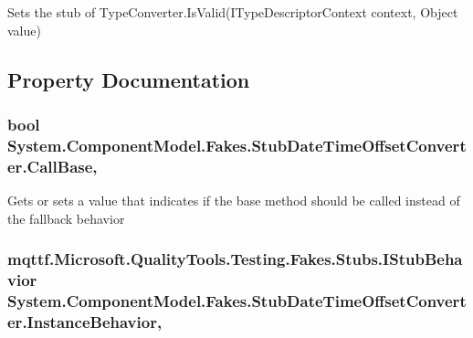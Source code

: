 Sets the stub of Type\-Converter.\-Is\-Valid(\-I\-Type\-Descriptor\-Context context, Object value)



\subsection{Property Documentation}
\hypertarget{class_system_1_1_component_model_1_1_fakes_1_1_stub_date_time_offset_converter_a274bfe86e647f89a1c5f72efcd0aced6}{
\subsubsection[{Call\-Base}]{\setlength{\rightskip}{0pt plus 5cm}bool System.\-Component\-Model.\-Fakes.\-Stub\-Date\-Time\-Offset\-Converter.\-Call\-Base\hspace{0.3cm}{\ttfamily [get]}, {\ttfamily [set]}}}\label{class_system_1_1_component_model_1_1_fakes_1_1_stub_date_time_offset_converter_a274bfe86e647f89a1c5f72efcd0aced6}


Gets or sets a value that indicates if the base method should be called instead of the fallback behavior

\hypertarget{class_system_1_1_component_model_1_1_fakes_1_1_stub_date_time_offset_converter_a437e07f390af061b9754a11b8db950a3}{
\subsubsection[{Instance\-Behavior}]{\setlength{\rightskip}{0pt plus 5cm}mqttf.\-Microsoft.\-Quality\-Tools.\-Testing.\-Fakes.\-Stubs.\-I\-Stub\-Behavior System.\-Component\-Model.\-Fakes.\-Stub\-Date\-Time\-Offset\-Converter.\-Instance\-Behavior\hspace{0.3cm}{\ttfamily [get]}, {\ttfamily [set]}}}\label{class_system_1_1_component_model_1_1_fakes_1_1_stub_date_time_offset_converter_a437e07f390af061b9754a11b8db950a3}



